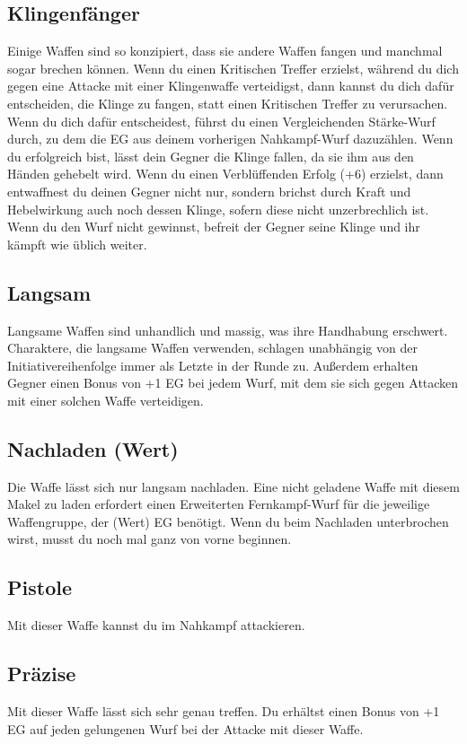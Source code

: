 \documentclass[a4paper, fontsize=9pt twocolumn]{scrartcl}
\begin{document}
\begin{multicols*}{2}
    \subsection{Klingenfänger}
    Einige Waffen sind so konzipiert, dass sie andere Waffen fangen und manchmal sogar brechen können.
    Wenn du einen Kritischen Treffer erzielst, während du dich gegen eine Attacke mit einer Klingenwaffe verteidigst, dann kannst du dich dafür entscheiden, die Klinge zu fangen, statt einen Kritischen Treffer zu verursachen.
    Wenn du dich dafür entscheidest, führst du einen Vergleichenden Stärke-Wurf durch, zu dem die EG aus deinem vorherigen Nahkampf-Wurf dazuzählen.
    Wenn du erfolgreich bist, lässt dein Gegner die Klinge fallen, da sie ihm aus den Händen gehebelt wird.
    Wenn du einen Verblüffenden Erfolg (+6) erzielst, dann entwaffnest du deinen Gegner nicht nur, sondern brichst durch Kraft und Hebelwirkung auch noch dessen Klinge, sofern diese nicht unzerbrechlich ist.
    Wenn du den Wurf nicht gewinnst, befreit der Gegner seine Klinge und ihr kämpft wie üblich weiter.

    \subsection{Langsam}
    Langsame Waffen sind unhandlich und massig, was ihre Handhabung erschwert.
    Charaktere, die langsame Waffen verwenden, schlagen unabhängig von der Initiativereihenfolge immer als Letzte in der Runde zu.
    Außerdem erhalten Gegner einen Bonus von +1 EG bei jedem Wurf, mit dem sie sich gegen Attacken mit einer solchen Waffe verteidigen.

    \subsection{Nachladen (Wert)}
    Die Waffe lässt sich nur langsam nachladen. Eine nicht geladene Waffe mit diesem Makel zu laden erfordert einen Erweiterten Fernkampf-Wurf für die jeweilige Waffengruppe, der (Wert) EG benötigt.
    Wenn du beim Nachladen unterbrochen wirst, musst du noch mal ganz von vorne beginnen.

    \subsection{Pistole}
    Mit dieser Waffe kannst du im Nahkampf attackieren.

    \subsection{Präzise}
    Mit dieser Waffe lässt sich sehr genau treffen. Du erhältst einen Bonus von +1 EG auf jeden gelungenen Wurf bei der Attacke mit dieser Waffe.


\end{multicols*}
\end{document}
